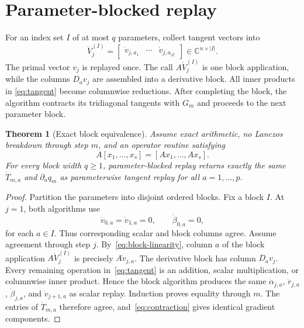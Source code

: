 \documentclass[10pt,letterpaper,twoside]{article}
\newtheorem{theorem}{Theorem}
\newcommand{\C}{\mathbb{C}}
\begin{document}
\section{Parameter-blocked replay}

For an index set $I$ of at most $q$ parameters, collect tangent vectors into
\begin{equation}
 \dot V_j^{(I)}=
 \begin{bmatrix}
 \dot v_{j,a_1}&\cdots&\dot v_{j,a_{|I|}}
 \end{bmatrix}\in\C^{n\times |I|}.
\end{equation}
The primal vector $v_j$ is replayed once.  The call
$A\dot V_j^{(I)}$ is one block application, while the columns
$D_av_j$ are assembled into a derivative block.  All inner products in
\eqref{eq:tangent} become columnwise reductions.  After completing the block,
the algorithm contracts its tridiagonal tangents with $G_m$ and proceeds to
the next parameter block.

\begin{theorem}[Exact block equivalence]
Assume exact arithmetic, no Lanczos breakdown through step $m$, and an
operator routine satisfying
\begin{equation}
 A[x_1,\ldots,x_s]=[Ax_1,\ldots,Ax_s].
 \label{eq:block-linearity}
\end{equation}
For every block width $q\geq1$, parameter-blocked replay returns exactly the
same $\dot T_{m,a}$ and $\partial_aq_m$ as parameterwise tangent replay for
all $a=1,\ldots,p$.
\end{theorem}

\begin{proof}
Partition the parameters into disjoint ordered blocks.  Fix a block $I$.
At $j=1$, both algorithms use
\begin{equation}
 \dot v_{0,a}=\dot v_{1,a}=0,
 \qquad \dot\beta_{0,a}=0,
 \end{equation}
for each $a\in I$.  Thus corresponding scalar and block columns agree.
Assume agreement through step $j$.  By~\eqref{eq:block-linearity}, column $a$
of the block application $A\dot V_j^{(I)}$ is precisely
$A\dot v_{j,a}$.  The derivative block has column $D_av_j$.  Every remaining
operation in~\eqref{eq:tangent} is an addition, scalar multiplication, or
columnwise inner product.  Hence the block algorithm produces the same
$\dot\alpha_{j,a}$, $\dot r_{j,a}$, $\dot\beta_{j,a}$, and
$\dot v_{j+1,a}$ as scalar replay.  Induction proves equality through $m$.
The entries of $\dot T_{m,a}$ therefore agree, and~\eqref{eq:contraction}
gives identical gradient components.
\end{proof}
\end{document}
